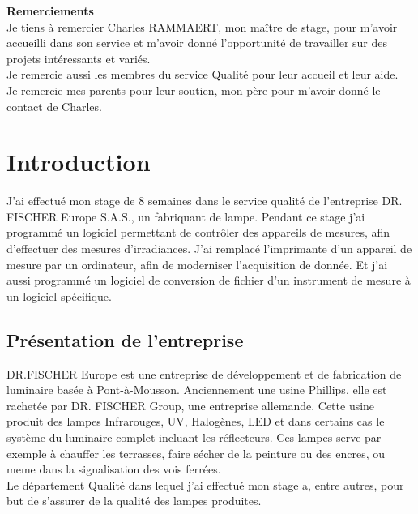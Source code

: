 \documentclass[12pt]{article}
\begin{document}
\thispagestyle{empty}

\restoregeometry
\onehalfspacing
\newpage
\textbf{\Large{Remerciements}}\\

Je tiens à remercier Charles RAMMAERT, mon maître de stage, pour m'avoir accueilli dans son service et m'avoir donné l'opportunité de travailler sur des projets intéressants et variés.\\
Je remercie aussi les membres du service Qualité pour leur accueil et leur aide.\\
Je remercie mes parents pour leur soutien, mon père pour m'avoir donné le contact de Charles.


\thispagestyle{empty}

\newpage
\singlespacing
\thispagestyle{empty}
\tableofcontents
\newpage
\onehalfspacing

\section{Introduction}

J'ai effectué mon stage de 8 semaines dans le service qualité de l'entreprise DR. FISCHER Europe S.A.S., un fabriquant de lampe.
Pendant ce stage j'ai programmé un logiciel permettant de contrôler des appareils de mesures, afin d'effectuer des mesures d'irradiances.
J'ai remplacé l'imprimante d'un appareil de mesure par un ordinateur, afin de moderniser l'acquisition de donnée.
Et j'ai aussi programmé un logiciel de conversion de fichier d'un instrument de mesure à un logiciel spécifique.


\newpage
\subsection{Présentation de l'entreprise}

DR.FISCHER Europe est une entreprise de développement et de fabrication de luminaire basée à Pont-à-Mousson.
Anciennement une usine Phillips, elle est rachetée par DR. FISCHER Group, une entreprise allemande.
Cette usine produit des lampes Infrarouges, UV, Halogènes, LED et dans certains cas le système du luminaire complet incluant les réflecteurs.
Ces lampes serve par exemple à chauffer les terrasses, faire sécher de la peinture ou des encres, ou meme dans la signalisation des vois ferrées.\\
Le département Qualité dans lequel j'ai effectué mon stage a, entre autres, pour but de s'assurer de la qualité des lampes produites.
\newpage
\end{document}
